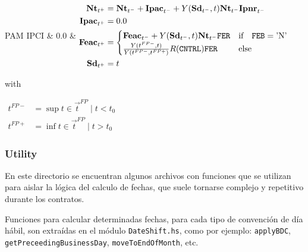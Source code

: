 \documentclass[12pt]{book}
\begin{document}
\begin{functions}{PAM}
	IPCI & 0.0
	& {$\begin{aligned}
					\textbf{Nt}_{t^+}   & = \textbf{Nt}_{t^-} + \textbf{Ipac}_{t^-} + Y (\textbf{Sd}_{t^-},t)\textbf{Nt}_{t^-}\textbf{Ipnr}_{t^-}                                         \\
					\textbf{Ipac}_{t^+} & = 0.0                                                                                                                               \\
					\textbf{Feac}_{t^+} & = \begin{cases} \textbf{Feac}_{t^-} + Y (\textbf{Sd}_{t^-},t)\textbf{Nt}_{t^-}\texttt{FER} & \text{if} \quad \texttt{FEB}=\text{'N'} \\
              \frac{Y (t^{FP-},t)}{Y (t^{FP-},t^{FP+})}R (\texttt{CNTRL})\texttt{FER}      & \text{else}\end{cases} \\
					\textbf{Sd}_{t^+}   & = t\end{aligned}$} \par
	with\par
	{$\begin{aligned}
				t^{FP-} & = \sup t \in \vec{t}^{FP}\mid t<t_0 \\
				t^{FP+} & = \inf t \in \vec{t}^{FP}\mid t>t_0\end{aligned}$} \\
	\hline
\end{functions}
\endgroup




\subsubsection{Utility}

En este directorio se encuentran algunos archivos con funciones que se utilizan para aislar la lógica del calculo de fechas, que suele tornarse complejo y repetitivo durante los contratos.


\sloppy Funciones para calcular determinadas fechas, para cada tipo de convención de día hábil, son extraídas en el módulo \texttt{DateShift.hs}, como por ejemplo: \texttt{applyBDC}, \texttt{getPreceedingBusinessDay}, \texttt{moveToEndOfMonth}, etc.
\end{document}
